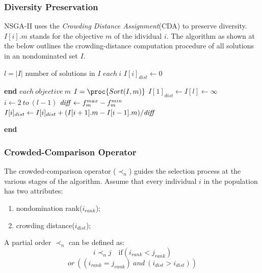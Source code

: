 \documentclass[a4paper, 11pt]{article}
\renewcommand{\End}{\kill\addtocounter{indent}{-1}\liprint\textbf{end} }
\begin{document}
\subsubsection{Diversity Preservation}
NSGA-II uses the \emph{Crowding Distance Assignment}(CDA) to preserve diversity. $I[i].m$ stands for the objective $m$ of the idividual $i$.
The algorithm as shown at the below outlines the crowding-distance computation procedure of all solutions in an nondominated set $I$.

\begin{codebox}
\li $l=|I|$ \Comment number of solutions in $I$
\li \For $each\ i$
\li \Do
\li    $I[i]_{dist} \gets 0$
\li  \End
\li \For $each\ objective\ m$
\li     \Do
\li         $I=\proc{Sort(I, m)}$
\li         $I[1]_{dist} \gets I[l] \gets \infty$
\li         \For $i \gets 2\ to\ (l-1)$
\li           \Do
\li              $\mbox{\emph{diff}}\gets f^{max}_m - f^{min}_m$
\li              $I[i]_{dist} \gets I[i]_{dist}+(I[i+1].m-I[i-1].m)/\mbox{\emph{diff}}$
\li     \End
\end{codebox}

\subsubsection{Crowded-Comparison Operator}
The crowded-comparison operator ($\prec_n$) guides the selection process at the various stages of the algorithm. Assume that every individual $i$ in the population
has two attributes:
\begin{enumerate}[1)]
\item nondomination rank($i_{rank}$);
\item crowding distance($i_{dist}$);
\end{enumerate}
A partial order $\prec_n$ can be defined as:
\begin{displaymath}
i\prec_n j\quad\mbox{if}(i_{rank}<j_{rank})
\end{displaymath}
\begin{displaymath}
or\ ((i_{rank}=j_{rank})\ and\ (i_{dist}>i_{dist}))
\end{displaymath}
\end{document}
